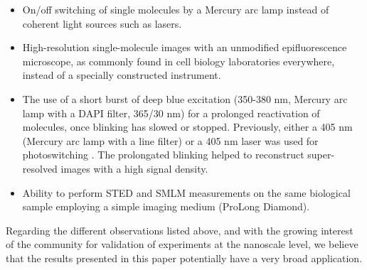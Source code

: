 \documentclass[9pt,twocolumn,twoside]{pnas-new}
\begin{document}
\begin{itemize}
\item
 On/off switching of single molecules by a Mercury arc lamp instead of coherent light sources such as lasers.  
\item
High-resolution single-molecule images with an unmodified epifluorescence microscope, as commonly found in cell biology laboratories everywhere, instead of a specially constructed instrument.
\item
The use of a short burst of deep blue excitation (350-380 nm, Mercury arc lamp with a DAPI filter, 365/30 nm) for a prolonged reactivation of molecules, once blinking has slowed or stopped. Previously, either a 405 nm (Mercury arc lamp with a line filter) or a 405 nm laser was used for photoswitching \citep{dickson1997off, betzig2006}. The prolongated blinking helped to reconstruct super-resolved images with a high signal density. 
\item
Ability to perform STED and SMLM measurements on the same biological sample employing a simple imaging medium (ProLong Diamond).
\end{itemize}

Regarding the different observations listed above, and with the growing interest of the community for validation of experiments at the nanoscale level, we believe that the results presented in this paper potentially have a very broad application.
\end{document}
